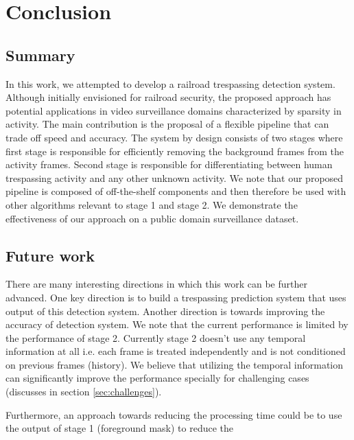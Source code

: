 \section{Conclusion}

\subsection{Summary}
In this work, we attempted to develop a railroad trespassing detection system. Although initially envisioned for railroad security, the proposed approach has potential applications in video surveillance domains characterized by sparsity in activity. The main contribution is the proposal of a flexible pipeline that can trade off speed and accuracy. The system by design consists of two stages where first stage is responsible for efficiently removing the background frames from the activity frames. Second stage is responsible for differentiating between human trespassing activity and any other unknown activity. We note that our proposed pipeline is composed of off-the-shelf components and then therefore be used with other algorithms relevant to stage 1 and stage 2. We demonstrate the effectiveness of our approach on a public domain surveillance dataset. 

\subsection{Future work}
There are many interesting directions in which this work can be further advanced. One key direction is to build a trespassing prediction system that uses output of this detection system. Another direction is towards improving the accuracy of detection system. We note that the current performance is limited by the performance of stage 2. Currently stage 2 doesn't use any temporal information at all i.e. each frame is treated independently and is not conditioned on previous frames (history). We believe that utilizing the temporal information can significantly improve the performance specially for challenging cases (discusses in section \ref{sec:challenges}). 

Furthermore, an approach towards reducing the processing time could be to use the output of stage 1 (foreground mask) to reduce the 

\newpage